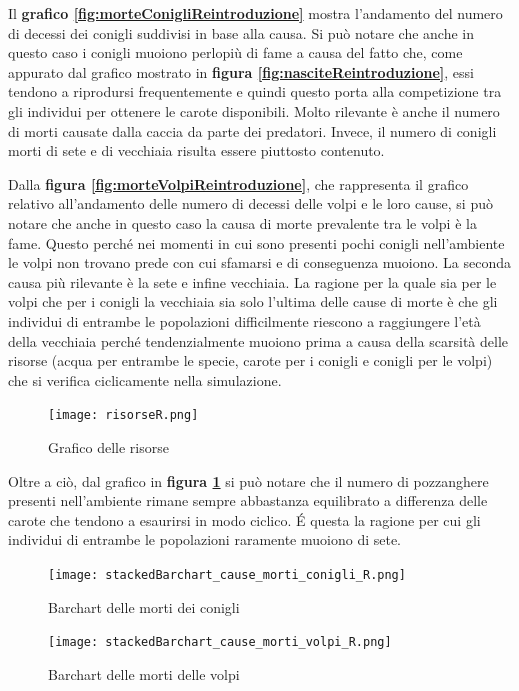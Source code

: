 \documentclass[11pt]{article}
\begin{document}
Il \textbf{grafico \ref{fig:morteConigliReintroduzione}} mostra l'andamento del numero di decessi dei conigli suddivisi in base alla causa. Si può notare che anche in questo caso i conigli muoiono perlopiù di fame a causa del fatto che, come appurato dal grafico mostrato in \textbf{figura \ref{fig:nasciteReintroduzione}}, essi tendono a riprodursi frequentemente e quindi questo porta alla competizione tra gli individui per ottenere le carote disponibili. Molto rilevante è anche il numero di morti causate dalla caccia da parte dei predatori. Invece, il numero di conigli morti di sete e di vecchiaia risulta essere piuttosto contenuto. 

Dalla \textbf{figura \ref{fig:morteVolpiReintroduzione}}, che rappresenta il grafico relativo all'andamento delle numero di decessi delle volpi e le loro cause, si può notare che anche in questo caso la causa di morte prevalente tra le volpi è la fame. Questo perché nei momenti in cui sono presenti pochi conigli nell'ambiente le volpi non trovano prede con cui sfamarsi e di conseguenza muoiono. La seconda causa più rilevante è la sete e infine vecchiaia. La ragione per la quale sia per le volpi che per i conigli la vecchiaia sia solo l'ultima delle cause di morte è che gli individui di entrambe le popolazioni difficilmente riescono a raggiungere l'età della vecchiaia perché tendenzialmente muoiono prima a causa della scarsità delle risorse (acqua per entrambe le specie, carote per i conigli e conigli per le volpi) che si verifica ciclicamente nella simulazione. 



\begin{figure}[!ht]
     \centering
     \texttt{[image: risorseR.png]}
     \caption{Grafico delle risorse}
     \label{fig:risorseReintroduzione}
\end{figure}


Oltre a ciò, dal grafico in \textbf{figura \ref{fig:risorseReintroduzione}} si può notare che il numero di pozzanghere presenti nell'ambiente rimane sempre abbastanza equilibrato a differenza delle carote che tendono a esaurirsi in modo ciclico. É questa la ragione per cui gli individui di entrambe le popolazioni raramente muoiono di sete.

\newpage

\begin{figure}[!ht]
    \hspace{-1.7cm}
     \texttt{[image: stackedBarchart\_cause\_morti\_conigli\_R.png]}
     \caption{Barchart delle morti dei conigli}
     \label{fig:barchartConigliR}
\end{figure}
\begin{figure}[!ht]
    \hspace{-1.7cm}
     \texttt{[image: stackedBarchart\_cause\_morti\_volpi\_R.png]}
     \caption{Barchart delle morti delle volpi}
     \label{fig:barchhartVolpiR}
\end{figure}
\end{document}
